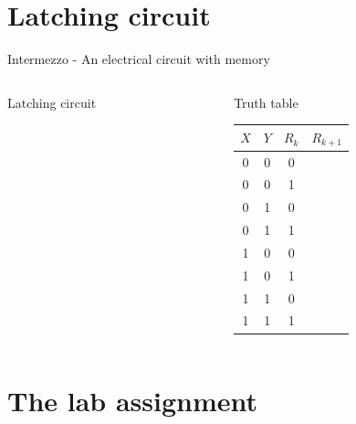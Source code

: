 \documentclass[presentation,aspectratio=1610]{beamer}
\newcommand*{\coil}[1]{to[short] ++(0.5, 0) node[coordinate] (orig) {} arc [start angle=180, end angle=150,radius=8mm] (orig) arc [start angle=180, end angle=210,radius=8mm] (orig) ++(1cm, 0) node[coordinate] (coilend) {} arc [start angle=0, end angle=30,radius=8mm] (coilend) arc [start angle=0, end angle=-30,radius=8mm] (coilend) to[short] ++(0.5cm, 0) (orig) ++(0.5, 0.8) node {#1}}
\begin{document}
\section{Latching circuit}
\label{sec:org0c112cf}
\begin{frame}[label={sec:org6a03413}]{Intermezzo - An electrical circuit with memory}
\begin{columns}
\begin{column}{0.6\columnwidth}
\begin{block}{Latching circuit}
\begin{center}
\end{center}
\end{block}
\end{column}


\begin{column}{0.4\columnwidth}
\begin{block}{Truth table}
\begin{center}
\begin{tabular}{|ccc|c|}
\(X\) & \(Y\) & \(R_k\) & \(R_{k+1}\)\\
\hline
0 & 0 & 0 & \\
0 & 0 & 1 & \\
0 & 1 & 0 & \\
0 & 1 & 1 & \\
1 & 0 & 0 & \\
1 & 0 & 1 & \\
1 & 1 & 0 & \\
1 & 1 & 1 & \\
\hline
\end{tabular}
\end{center}
\end{block}
\end{column}
\end{columns}
\end{frame}

\section{The lab assignment}
\label{sec:org84149d7}
\end{document}
